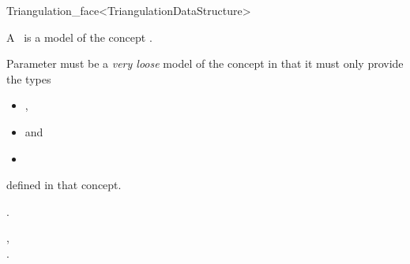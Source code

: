 \begin{ccRefClass}{Triangulation_face<TriangulationDataStructure>}

\ccDefinition

A \ccRefName\ is a model of the concept .

\ccParameters

Parameter  must be a {\em very loose} model of the concept
 in that it must only provide the
types\begin{itemize}
\item {},
\item {} and
\item {}\end{itemize} defined in that concept.


\ccIsModel

.

\ccSeeAlso

,\\
.

\end{ccRefClass}
